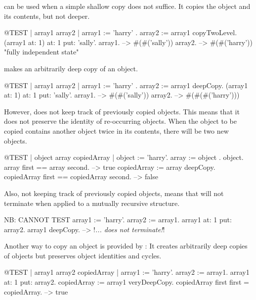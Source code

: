 \documentclass[a4paper,10pt,twoside]{book}
\begin{document}
 can be used when a simple shallow copy does not suffice. It copies the object and its contents, but not deeper.

\begin{code}{@TEST | array1 array2 |}
array1 := { { 'harry' } } .
array2 := array1 copyTwoLevel.
(array1 at: 1) at: 1 put: 'sally'.
array1. --> #(#('sally'))
array2. --> #(#('harry'))    "fully independent state"
\end{code}

 makes an arbitrarily deep copy of an object.

\begin{code}{@TEST | array1 array2 |}
array1 := { { { 'harry' } } } .
array2 := array1 deepCopy.
(array1 at: 1) at: 1 put: 'sally'.
array1. --> #(#('sally'))
array2. --> #(#(#('harry')))
\end{code}

However,  does not keep track of previously copied objects. This means that it does not preserve the identity of re-occurring objects. When the object to be copied contains another object twice in its contents, there will be two new objects. 

\begin{code}{@TEST | object array copiedArray |}
object := {'harry'}.
array := {object . object}.
array first == array second. --> true
copiedArray := array deepCopy.
copiedArray first == copiedArray second. --> false
\end{code}

Also, not keeping track of previously copied objects, means that  will not terminate when applied to a mutually recursive structure.

\begin{code}{NB: CANNOT TEST}
array1 := {'harry'}.
array2 := {array1}.
array1 at: 1 put: array2.
array1 deepCopy. --> !\emph{... does not terminate!}!
\end{code}

Another way to copy an object is provided by : 
It creates arbitrarily deep copies of objects but preserves object identities and cycles. 

\begin{code}{@TEST | array1 array2 copiedArray |}
array1 := {'harry'}.
array2 := {array1}.
array1 at: 1 put: array2.
copiedArray := array1 veryDeepCopy.
copiedArray first first = copiedArray. --> true
\end{code}
\end{document}
